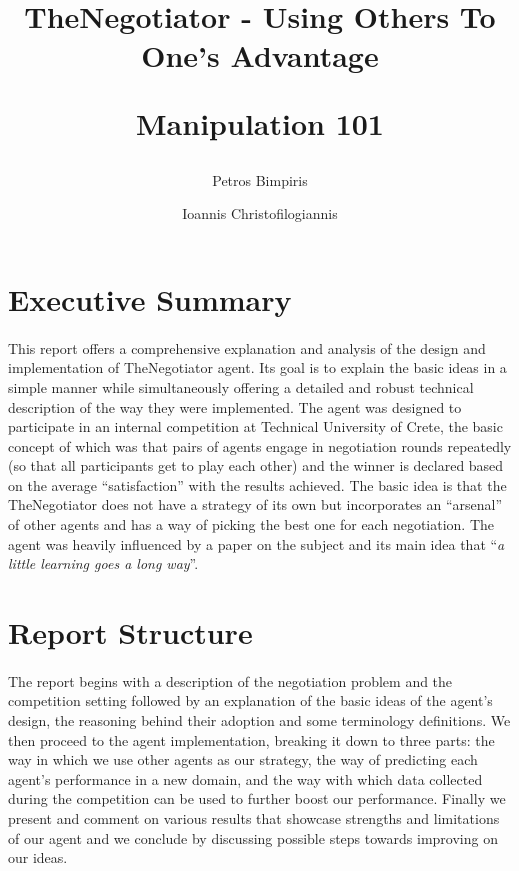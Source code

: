 \documentclass[12pt]{article}
\author{%
	Petros Bimpiris
	\and
	Ioannis Christofilogiannis
}
\date{
	\begin{center}
	\hspace{2.5cm}Technical University of Crete
	\newline
	\phantom{--------------}Multiagent Systems (COMP512)		%
	\newline
	February 2024 
	\end{center}
	\vspace{-0.5cm}
}
\title{
	\vspace{-2cm}
	\textbf{TheNegotiator - Using Others To One's Advantage}

	Manipulation 101
}
\numberwithin{equation}{section}
\newcommand{\quotes}[1]{\textquotedblleft{}#1\textquotedblright}
\begin{document}
 

	\maketitle

	\section*{Executive Summary}	\label{sec:execuctive_summary}		%

		\paragraph*{}
			This report offers a comprehensive explanation and analysis of the design and implementation of TheNegotiator agent. Its goal is to explain the basic ideas in a simple manner while simultaneously offering a detailed and robust technical description of the way they were implemented.
			The agent was designed to participate in an internal competition at Technical University of Crete, the basic concept of which was that pairs of agents engage in negotiation rounds repeatedly (so that all participants get to play each other) and the winner is declared based on the average \quotes{satisfaction} with the results achieved.
			The basic idea is that the TheNegotiator does not have a strategy of its own but incorporates an \quotes{arsenal} of other agents and has a way of picking the best one for each negotiation. The agent was heavily influenced by a paper on the subject \cite{meta_agent_paper} and its main idea that \quotes{\emph{a little learning goes a long way}}.


	\section*{Report Structure}	\label{sec:report_structure}		%

		\paragraph*{}
			The report begins with a description of the negotiation problem and the competition setting followed by an explanation of the basic ideas of the agent's design, the reasoning behind their adoption and some terminology definitions.
			We then proceed to the agent implementation, breaking it down to three parts: the way in which we use other agents as our strategy, the way of predicting each agent's performance in a new domain, and the way with which data collected during the competition can be used to further boost our performance. Finally we present and comment on various results that showcase strengths and limitations of our agent and we conclude by discussing possible steps towards improving on our ideas.
			\hfill
\end{document}
